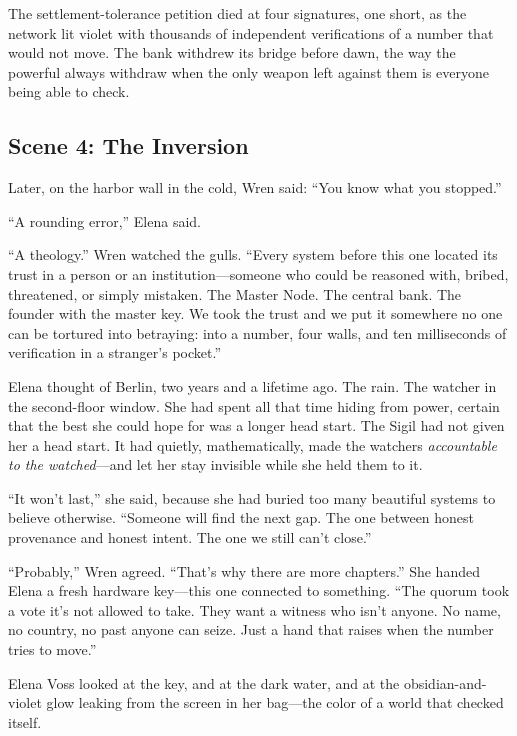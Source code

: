 \documentclass[12pt,letterpaper]{book}
\begin{document}
The settlement-tolerance petition died at four signatures, one short, as the
network lit violet with thousands of independent verifications of a number that
would not move. The bank withdrew its bridge before dawn, the way the powerful
always withdraw when the only weapon left against them is everyone being able to
check.

\hypertarget{scene-4-the-inversion}{%
\subsection{Scene 4: The
Inversion}\label{scene-4-the-inversion}}

Later, on the harbor wall in the cold, Wren said: ``You know what you stopped.''

``A rounding error,'' Elena said.

``A theology.'' Wren watched the gulls. ``Every system before this one located
its trust in a person or an institution---someone who could be reasoned with,
bribed, threatened, or simply mistaken. The Master Node. The central bank. The
founder with the master key. We took the trust and we put it somewhere no one
can be tortured into betraying: into a number, four walls, and ten milliseconds
of verification in a stranger's pocket.''

Elena thought of Berlin, two years and a lifetime ago. The rain. The watcher in
the second-floor window. She had spent all that time hiding from power, certain
that the best she could hope for was a longer head start. The Sigil had not given
her a head start. It had quietly, mathematically, made the watchers
\emph{accountable to the watched}---and let her stay invisible while she held them
to it.

``It won't last,'' she said, because she had buried too many beautiful systems to
believe otherwise. ``Someone will find the next gap. The one between honest
provenance and honest intent. The one we still can't close.''

``Probably,'' Wren agreed. ``That's why there are more chapters.'' She handed
Elena a fresh hardware key---this one connected to something. ``The quorum took a
vote it's not allowed to take. They want a witness who isn't anyone. No name, no
country, no past anyone can seize. Just a hand that raises when the number tries
to move.''

Elena Voss looked at the key, and at the dark water, and at the obsidian-and-violet
glow leaking from the screen in her bag---the color of a world that checked
itself.
\end{document}
